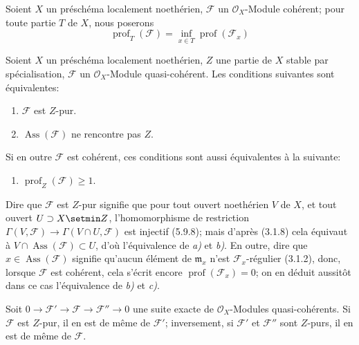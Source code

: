 \begin{env}[5.10.1]
\label{IV.2.s5.10.1-fr}
Soient $X$ un préschéma localement noethérien, $\mathcal F$ un
$\mathcal O_X$-Module cohérent; pour toute partie $T$ de $X$, nous poserons
\begin{equation}
\operatorname{prof}_T(\mathcal F)
=\inf_{x\in T}\operatorname{prof}(\mathcal F_x)
\tag{5.10.1.1}\label{IV.2.s5.10.1.1-fr}
\end{equation}
\end{env}

\begin{proposition}[5.10.2]
Soient $X$ un préschéma localement noethérien, $Z$ une partie de $X$ stable
par spécialisation, $\mathcal F$ un $\mathcal O_X$-Module quasi-cohérent.
Les conditions suivantes sont équivalentes:
\begin{enumerate}
\item[\textup{a)}] $\mathcal F$ est $Z$-pur.
\item[\textup{b)}] $\operatorname{Ass}(\mathcal F)$ ne rencontre pas $Z$.
\end{enumerate}
Si en outre $\mathcal F$ est cohérent, ces conditions sont aussi équivalentes
à la suivante:
\begin{enumerate}
\item[\textup{c)}] $\operatorname{prof}_Z(\mathcal F)\geq1$.
\end{enumerate}
\end{proposition}

Dire que $\mathcal F$ est $Z$-pur signifie que pour tout ouvert noethérien
$V$ de $X$, et tout ouvert $U\supset X\setmin Z$, l'homomorphisme de restriction
$\Gamma(V,\mathcal F)\longrightarrow\Gamma(V\cap U,\mathcal F)$
est injectif (5.9.8); mais d'après (3.1.8) cela équivaut à
$V\cap\operatorname{Ass}(\mathcal F)\subset U$, d'où l'équivalence de \emph{a)} et
\emph{b)}. En outre, dire que $x\in\operatorname{Ass}(\mathcal F)$ signifie
qu'aucun élément de $\mathfrak m_x$ n'est $\mathcal F_x$-régulier (3.1.2),
donc, lorsque $\mathcal F$ est cohérent, cela s'écrit encore
$\operatorname{prof}(\mathcal F_x)=0$; on en déduit aussitôt dans ce cas
l'équivalence de \emph{b)} et \emph{c)}.

\begin{corollary}[5.10.3]
\label{IV.2.s5.10.3-fr}
Soit
$0\longrightarrow\mathcal F'\longrightarrow\mathcal F
\longrightarrow\mathcal F''\longrightarrow0$
une suite exacte de $\mathcal O_X$-Modules quasi-cohérents. Si $\mathcal F$
est $Z$-pur, il en est de même de $\mathcal F'$; inversement, si
$\mathcal F'$ et $\mathcal F''$ sont $Z$-purs, il en est de même de
$\mathcal F$.
\end{corollary}

